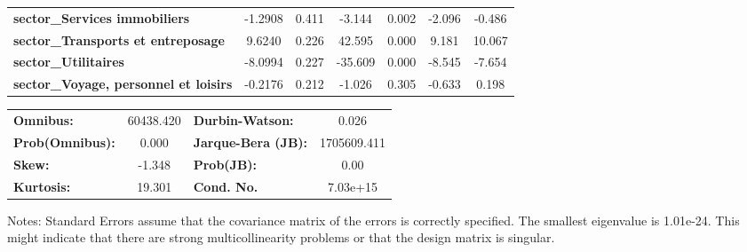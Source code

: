 \begin{center}
\begin{tabular}{lcccccc}
\textbf{sector\_Services immobiliers}                                 &      -1.2908  &        0.411     &    -3.144  &         0.002        &       -2.096    &       -0.486     \\
\textbf{sector\_Transports et entreposage}                            &       9.6240  &        0.226     &    42.595  &         0.000        &        9.181    &       10.067     \\
\textbf{sector\_Utilitaires}                                          &      -8.0994  &        0.227     &   -35.609  &         0.000        &       -8.545    &       -7.654     \\
\textbf{sector\_Voyage, personnel et loisirs}                         &      -0.2176  &        0.212     &    -1.026  &         0.305        &       -0.633    &        0.198     \\
\bottomrule
\end{tabular}
\begin{tabular}{lclc}
\textbf{Omnibus:}       & 60438.420 & \textbf{  Durbin-Watson:     } &      0.026   \\
\textbf{Prob(Omnibus):} &    0.000  & \textbf{  Jarque-Bera (JB):  } & 1705609.411  \\
\textbf{Skew:}          &   -1.348  & \textbf{  Prob(JB):          } &       0.00   \\
\textbf{Kurtosis:}      &   19.301  & \textbf{  Cond. No.          } &   7.03e+15   \\
\bottomrule
\end{tabular}
\end{center}

Notes: \newline
 [1] Standard Errors assume that the covariance matrix of the errors is correctly specified. \newline
 [2] The smallest eigenvalue is 1.01e-24. This might indicate that there are \newline
 strong multicollinearity problems or that the design matrix is singular.